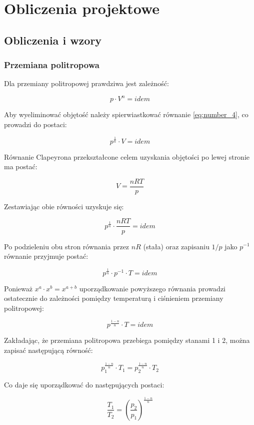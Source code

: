 \chapter{Obliczenia projektowe}

\section{Obliczenia i wzory}

\subsection{Przemiana politropowa}
Dla przemiany politropowej prawdziwa jest zależność:

\begin{equation}
p \cdot V^n = idem
\label{eq:number_4}
\end{equation}

Aby wyeliminować objętość należy spierwiastkować równanie \eqref{eq:number_4}, co prowadzi do postaci:

\[p^{\frac {1}{n}} \cdot V = idem\]

Równanie Clapeyrona przekształcone celem uzyskania objętości po lewej stronie ma postać:

\[V = \frac{nRT} {p}\]

Zestawiając obie równości uzyskuje się:

\[p^{\frac {1}{n}} \cdot \frac{nRT} {p} = idem\]

Po podzieleniu obu stron równania przez $nR$ (stała) oraz zapisaniu $1/p$ jako $p^{-1}$ równanie przyjmuje postać:

\[p^{\frac {1}{n}} \cdot p^{-1} \cdot T = idem\]

Ponieważ $x^a \cdot x^b = x^{a+b}$ uporządkowanie powyższego równania prowadzi ostatecznie do zależności pomiędzy temperaturą i ciśnieniem przemiany politropowej:

\[p^{\frac {1-n}{n}} \cdot T = idem\]

Zakładając, że przemiana politropowa przebiega pomiędzy stanami 1 i 2, można zapisać następującą równość:

\[p_1 ^{\frac {1-n}{n}} \cdot T_1 = p_2 ^{\frac {1-n}{n}} \cdot T_2\]

Co daje się uporządkować do następujących postaci:

\begin{equation}
\frac{T_1}{T_2} =   \left( \frac {p_2}{p_1}\right) ^{\frac {1-n}{n}}
\label{eq:number_5}
\end{equation}

